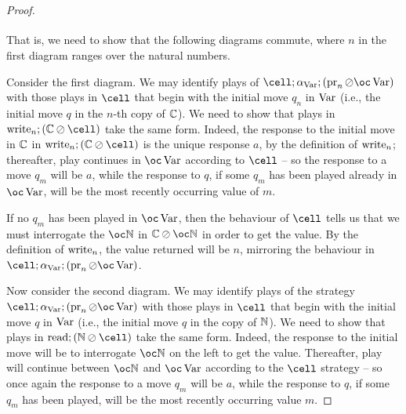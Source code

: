 \begin{proof}
\[\begin{tikzcd}[column sep=60pt]
    \end{tikzcd}
    \]
  That is, we need to show that the following diagrams commute, where $n$ in the first diagram ranges over the natural numbers.
  Consider the first diagram.  
  We may identify plays of $\cell;\alpha_{\Varr};(\pr_n\sequoid\oc\Varr)$ with those plays in $\cell$ that begin with the initial move $q_n$ in $\operatorname{Var}$ (i.e., the initial move $q$ in the $n$-th copy of $\mathbb{C}$).
  We need to show that plays in $\wwrite_n;(\bC\sequoid\cell)$ take the same form.  
  Indeed, the response to the initial move in $\mathbb{C}$ in $\wwrite_n;(\bC\sequoid\cell)$ is the unique response $a$, by the definition of $\operatorname{write}_n$; thereafter, play continues in $\oc\Varr$ according to $\cell$ -- so the response to a move $q_m$ will be $a$, while the response to $q$, if some $q_m$ has been played already in $\oc\Varr$, will be the most recently occurring value of $m$.  

  If no $q_m$ has been played in $\oc\Varr$, then the behaviour of $\cell$ tells us that we must interrogate the $\oc\bN$ in $\bC\sequoid\oc\bN$ in order to get the value.  
  By the definition of $\operatorname{write}_n$, the value returned will be $n$, mirroring the behaviour in $\cell;\alpha_{\Varr};(\pr_n\sequoid\oc\Varr)$.

  Now consider the second diagram.  
  We may identify plays of the strategy $\cell;\alpha_{\Varr};(\pr_n\sequoid\oc\Varr)$ with those plays in $\cell$ that begin with the initial move $q$ in $\operatorname{Var}$ (i.e., the initial move $q$ in the copy of $\mathbb{N}$).
  We need to show that plays in $\rread;(\bN\sequoid\cell)$ take the same form.  
  Indeed, the response to the initial move will be to interrogate $\oc\bN$ on the left to get the value.  
  Thereafter, play will continue between $\oc\bN$ and $\oc\Varr$ according to the $\cell$ strategy -- so once again the response to a move $q_m$ will be $a$, while the response to $q$, if some $q_m$ has been played, will be the most recently occurring value $m$.


\end{proof}
